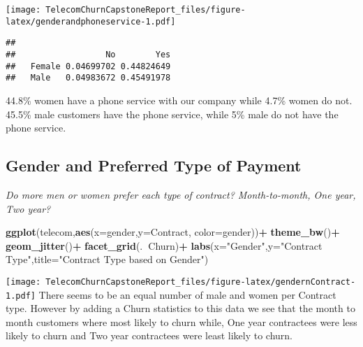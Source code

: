 \documentclass[]{article}
\newenvironment{Shaded}{\begin{snugshade}}{\end{snugshade}}
\newcommand{\KeywordTok}[1]{\textcolor[rgb]{0.13,0.29,0.53}{\textbf{#1}}}
\newcommand{\DataTypeTok}[1]{\textcolor[rgb]{0.13,0.29,0.53}{#1}}
\newcommand{\StringTok}[1]{\textcolor[rgb]{0.31,0.60,0.02}{#1}}
\newcommand{\OperatorTok}[1]{\textcolor[rgb]{0.81,0.36,0.00}{\textbf{#1}}}
\newcommand{\NormalTok}[1]{#1}
\begin{document}
\texttt{[image: TelecomChurnCapstoneReport\_files/figure-latex/genderandphoneservice-1.pdf]}

\begin{Shaded}
\end{Shaded}

\begin{verbatim}
##         
##                  No        Yes
##   Female 0.04699702 0.44824649
##   Male   0.04983672 0.45491978
\end{verbatim}

44.8\% women have a phone service with our company while 4.7\% women do
not. 45.5\% male customers have the phone service, while 5\% male do not
have the phone service.

\subsection{Gender and Preferred Type of
Payment}\label{gender-and-preferred-type-of-payment}

\emph{Do more men or women prefer each type of contract? Month-to-month,
One year, Two year?}

\begin{Shaded}
\begin{Highlighting}[]
\KeywordTok{ggplot}\NormalTok{(telecom,}\KeywordTok{aes}\NormalTok{(}\DataTypeTok{x=}\NormalTok{gender,}\DataTypeTok{y=}\NormalTok{Contract, }\DataTypeTok{color=}\NormalTok{gender))}\OperatorTok{+}
\StringTok{  }\KeywordTok{theme_bw}\NormalTok{()}\OperatorTok{+}
\StringTok{  }\KeywordTok{geom_jitter}\NormalTok{()}\OperatorTok{+}
\StringTok{  }\KeywordTok{facet_grid}\NormalTok{(.}\OperatorTok{~}\NormalTok{Churn)}\OperatorTok{+}
\StringTok{  }\KeywordTok{labs}\NormalTok{(}\DataTypeTok{x=}\StringTok{"Gender"}\NormalTok{,}\DataTypeTok{y=}\StringTok{"Contract Type"}\NormalTok{,}\DataTypeTok{title=}\StringTok{"Contract Type based on Gender"}\NormalTok{)}
\end{Highlighting}
\end{Shaded}

\texttt{[image: TelecomChurnCapstoneReport\_files/figure-latex/gendernContract-1.pdf]}
There seems to be an equal number of male and women per Contract type.
However by adding a Churn statistics to this data we see that the month
to month customers where most likely to churn while, One year
contractees were less likely to churn and Two year contractees were
least likely to churn.
\end{document}
